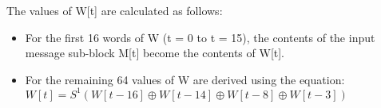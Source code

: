 The values of W[t] are calculated as follows:
\begin{itemize}
	\item For the first 16 words of W (t = 0 to t = 15), the contents of the input message sub-block M[t] become the contents of W[t].
	\item For the remaining 64 values of W are derived using the equation:\\
	$W[t] = S^1(W[t-16] \oplus W[t-14] \oplus W[t-8] \oplus W[t-3]) $
\end{itemize}










